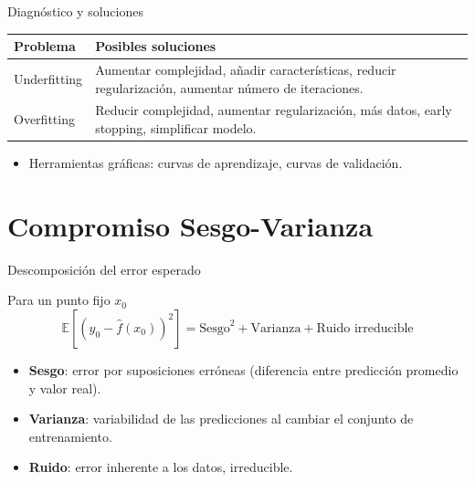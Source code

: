 \documentclass[aspectratio=169, 10pt, xcolor=table]{beamer}
\begin{document}
\begin{frame}{Diagnóstico y soluciones}
    \begin{table}
        \centering
        \begin{tabular}{p{4cm}|p{6cm}}
            \toprule
            \textbf{Problema} & \textbf{Posibles soluciones} \\
            \midrule
            Underfitting & Aumentar complejidad, añadir características, reducir regularización, aumentar número de iteraciones. \\
            Overfitting & Reducir complejidad, aumentar regularización, más datos, early stopping, simplificar modelo. \\
            \bottomrule
        \end{tabular}
    \end{table}
    \begin{itemize}
        \item Herramientas gráficas: curvas de aprendizaje, curvas de validación.
    \end{itemize}
\end{frame}

\section{Compromiso Sesgo-Varianza}

\begin{frame}{Descomposición del error esperado}
    \begin{block}{Para un punto fijo $x_0$}
        \[
        \mathbb{E}\left[ (y_0 - \hat{f}(x_0))^2 \right] = \text{Sesgo}^2 + \text{Varianza} + \text{Ruido irreducible}
        \]
        \begin{itemize}
            \item \textbf{Sesgo}: error por suposiciones erróneas (diferencia entre predicción promedio y valor real).
            \item \textbf{Varianza}: variabilidad de las predicciones al cambiar el conjunto de entrenamiento.
            \item \textbf{Ruido}: error inherente a los datos, irreducible.
        \end{itemize}
    \end{block}
\end{frame}
\end{document}
